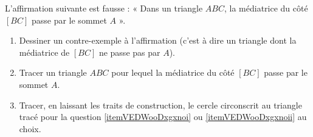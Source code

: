 
\begin{exercice}\label{exo2smath-0005}

    L'affirmation suivante est fausse : « Dans un triangle \( ABC\), la médiatrice du côté \( [BC]\) passe par le sommet \( A\) ».
    \begin{enumerate}
        \item   \label{itemVEDWooDxgxnoi}
            Dessiner un contre-exemple à l'affirmation (c'est à dire un triangle dont la médiatrice de \( [BC]\) ne passe pas par \( A\)).
        \item   \label{itemVEDWooDxgxnoii}
            Tracer un triangle \( ABC\) pour lequel la médiatrice du côté \( [BC]\) passe par le sommet \( A\).
        \item
            Tracer, en laissant les traits de construction, le cercle circonscrit au triangle tracé pour la question \ref{itemVEDWooDxgxnoi} ou \ref{itemVEDWooDxgxnoii} au choix.
    \end{enumerate}

\end{exercice}

